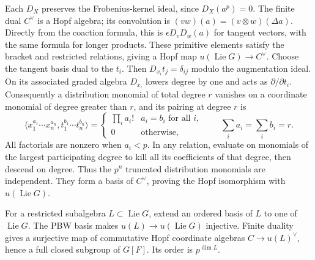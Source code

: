 \documentclass[11pt,a4paper,openany]{report}
\begin{document}
Each \(D_X\) preserves the Frobenius-kernel ideal, since \(D_X(a^p)=0\). The finite dual \(C^\vee\) is a Hopf algebra; its convolution is \((vw)(a)=(v\otimes w)(\Delta a)\). Directly from the coaction formula, this is \(\epsilon D_vD_w(a)\) for tangent vectors, with the same formula for longer products. These primitive elements satisfy the bracket and restricted relations, giving a Hopf map \(u(\operatorname{Lie}G)\to C^\vee\). Choose the tangent basis dual to the \(t_i\). Then \(D_{x_i}t_j=\delta_{ij}\) modulo the augmentation ideal. On its associated graded algebra \(D_{x_i}\) lowers degree by one and acts as \(\partial/\partial t_i\). Consequently a distribution monomial of total degree \(r\) vanishes on a coordinate monomial of degree greater than \(r\), and its pairing at degree \(r\) is \[
 \bigl\langle x_1^{a_1}\cdots x_n^{a_n},t_1^{b_1}\cdots t_n^{b_n}\bigr\rangle
 =\begin{cases}\prod_i a_i!&a_i=b_i\text{ for all }i,\\0&\text{otherwise},\end{cases}
 \qquad \sum_i a_i=\sum_i b_i=r.
\] All factorials are nonzero when \(a_i<p\). In any relation, evaluate on monomials of the largest participating degree to kill all its coefficients of that degree, then descend on degree. Thus the \(p^n\) truncated distribution monomials are independent. They form a basis of \(C^\vee\), proving the Hopf isomorphism with \(u(\operatorname{Lie}G)\).

For a restricted subalgebra \(L\subset\operatorname{Lie}G\), extend an ordered basis of \(L\) to one of \(\operatorname{Lie}G\). The PBW basis makes \(u(L)\to u(\operatorname{Lie}G)\) injective. Finite duality gives a surjective map of commutative Hopf coordinate algebras \(C\to u(L)^\vee\), hence a full closed subgroup of \(G[F]\). Its order is \(p^{\dim L}\).
\end{document}

